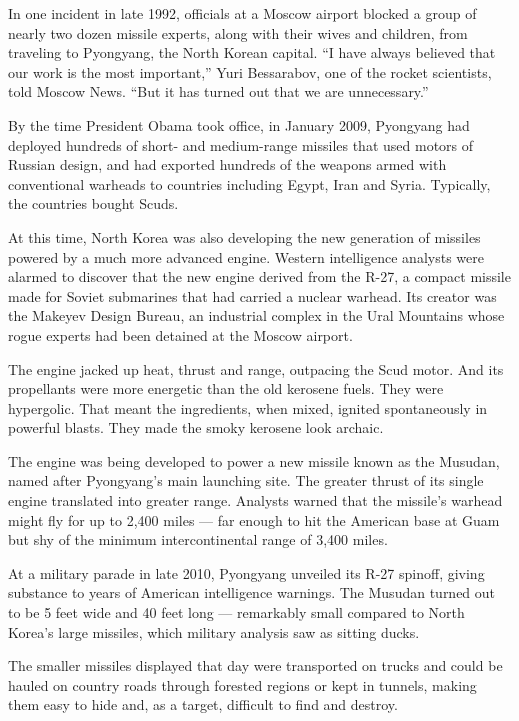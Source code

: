 In one incident in late 1992, officials at a Moscow airport blocked a
group of nearly two dozen missile experts, along with their wives and
children, from traveling to Pyongyang, the North Korean capital. ``I
have always believed that our work is the most important,'' Yuri
Bessarabov, one of the rocket scientists, told Moscow News. ``But it has
turned out that we are unnecessary.''

By the time President Obama took office, in January 2009, Pyongyang had
deployed hundreds of short- and medium-range missiles that used motors
of Russian design, and had exported hundreds of the weapons armed with
conventional warheads to countries including Egypt, Iran and Syria.
Typically, the countries bought Scuds.

At this time, North Korea was also developing the new generation of
missiles powered by a much more advanced engine. Western intelligence
analysts were alarmed to discover that the new engine derived from the
R-27, a compact missile made for Soviet submarines that had carried a
nuclear warhead. Its creator was the Makeyev Design Bureau, an
industrial complex in the Ural Mountains whose rogue experts had been
detained at the Moscow airport.

The engine jacked up heat, thrust and range, outpacing the Scud motor.
And its propellants were more energetic than the old kerosene fuels.
They were hypergolic. That meant the ingredients, when mixed, ignited
spontaneously in powerful blasts. They made the smoky kerosene look
archaic.

The engine was being developed to power a new missile known as the
Musudan, named after Pyongyang's main launching site. The greater thrust
of its single engine translated into greater range. Analysts warned that
the missile's warhead might fly for up to 2,400 miles --- far enough to
hit the American base at Guam but shy of the minimum intercontinental
range of 3,400 miles.

At a military parade in late 2010, Pyongyang unveiled its R-27 spinoff,
giving substance to years of American intelligence warnings. The Musudan
turned out to be 5 feet wide and 40 feet long --- remarkably small
compared to North Korea's large missiles, which military analysis saw as
sitting ducks.

The smaller missiles displayed that day were transported on trucks and
could be hauled on country roads through forested regions or kept in
tunnels, making them easy to hide and, as a target, difficult to find
and destroy.


